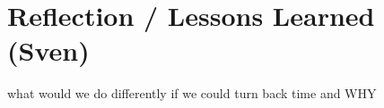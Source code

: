\section{Reflection / Lessons Learned (Sven)}
what would we do differently if we could turn back time and WHY

